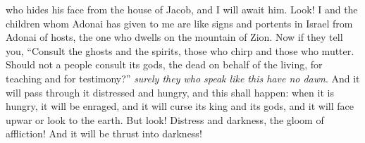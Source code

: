 \begin{biblechapter}
who hides his face from the house of Jacob, 
and I will await him.
\verse Look! I and the children whom Adonai has given to me are like signs and portents in Israel from Adonai of hosts, the one who dwells on the mountain of Zion.
\verse Now if they tell you, “Consult the ghosts and the spirits, those who chirp and those who mutter. Should not a people consult its gods, the dead on behalf of the living,
\verse for teaching and for testimony?” \textit{surely they who speak like this have no dawn}.
\verse And it will pass through it distressed and hungry, and this shall happen: when it is hungry, it will be enraged, and it will curse its king and its gods, and it will face upwar
\verse or look to the earth. But look! Distress and darkness, the gloom of affliction! And it will be thrust into darkness!
\end{biblechapter}

